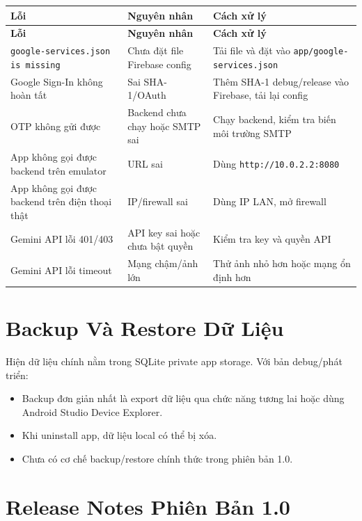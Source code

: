 \documentclass[12pt,a4paper]{report}
\begin{document}
\begin{longtable}{|>{\raggedright\arraybackslash}p{}|>{\raggedright\arraybackslash}p{}|>{\raggedright\arraybackslash}p{}|}
\hline
\textbf{Lỗi} & \textbf{Nguyên nhân} & \textbf{Cách xử lý} \\ \hline
\endfirsthead
\hline
\textbf{Lỗi} & \textbf{Nguyên nhân} & \textbf{Cách xử lý} \\ \hline
\endhead
\texttt{google-services.json is missing} & Chưa đặt file Firebase config & Tải file và đặt vào \texttt{app/google-services.json} \\ \hline
Google Sign-In không hoàn tất & Sai SHA-1/OAuth & Thêm SHA-1 debug/release vào Firebase, tải lại config \\ \hline
OTP không gửi được & Backend chưa chạy hoặc SMTP sai & Chạy backend, kiểm tra biến môi trường SMTP \\ \hline
App không gọi được backend trên emulator & URL sai & Dùng \texttt{http://10.0.2.2:8080} \\ \hline
App không gọi được backend trên điện thoại thật & IP/firewall sai & Dùng IP LAN, mở firewall \\ \hline
Gemini API lỗi 401/403 & API key sai hoặc chưa bật quyền & Kiểm tra key và quyền API \\ \hline
Gemini API lỗi timeout & Mạng chậm/ảnh lớn & Thử ảnh nhỏ hơn hoặc mạng ổn định hơn \\ \hline
\end{longtable}

\section{Backup Và Restore Dữ Liệu}

Hiện dữ liệu chính nằm trong SQLite private app storage. Với bản debug/phát triển:

\begin{itemize}
\item Backup đơn giản nhất là export dữ liệu qua chức năng tương lai hoặc dùng Android Studio Device Explorer.
\item Khi uninstall app, dữ liệu local có thể bị xóa.
\item Chưa có cơ chế backup/restore chính thức trong phiên bản 1.0.
\end{itemize}

\section{Release Notes Phiên Bản 1.0}
\end{document}
